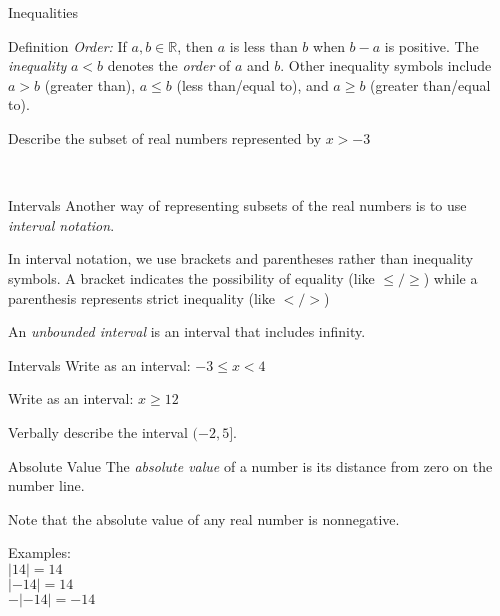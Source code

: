 \documentclass{beamer}
\def\R{\mathbb{R}} %
\newcommand{\av}[1]{\left|{#1}\right|} %
\begin{document}
\begin{frame}[t]{Inequalities}
\begin{block}{Definition}
\emph{Order:} If $a,b\in\R$, then $a$ is less than $b$ when $b - a$ is positive. The \textit{inequality} $a < b$ denotes the \textit{order} of $a$ and $b$. Other inequality symbols include $a > b$ (greater than), $a \leq b$ (less than/equal to), and $a \geq b$ (greater than/equal to).
\end{block}

Describe the subset of real numbers represented by $x > -3$ \\

 \\
\end{frame}

\begin{frame}[t]{Intervals}
Another way of representing subsets of the real numbers is to use \textit{interval notation}.

In interval notation, we use brackets and parentheses rather than inequality symbols. A bracket indicates the possibility of equality (like $\leq / \geq$) while a parenthesis represents strict inequality (like $< / >$)

An \textit{unbounded interval} is an interval that includes infinity.
\end{frame}

\begin{frame}[t]{Intervals}
Write as an interval: $-3\leq x < 4$ \\
\onslide<2->{$[-3,4)$} 

\vspace{24pt}

Write as an interval: $x \geq 12$ \\
\onslide<3->{$[12,\infty)$}

\vspace{24pt}

Verbally describe the interval $(-2,5]$. \\
\end{frame}

\begin{frame}[t]{Absolute Value}
The \textit{absolute value} of a number is its distance from zero on the number line.

Note that the absolute value of any real number is nonnegative.

Examples: \\
$\av{14} = 14$ \\
$\av{-14} = 14$ \\
$-\av{-14} = -14$
\end{frame}
\end{document}

